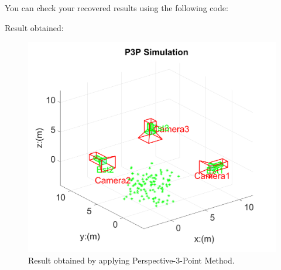 \documentclass[a4paper]{article}
\begin{document}
You can check your recovered results using the following code:

Result obtained:
\begin{figure}[!b]
\centering
\includegraphics[scale=0.9]{figures/p3p.png}
\caption{Result obtained by applying Perspective-$3$-Point Method.}
\end{figure}


%
%






\end{document}
